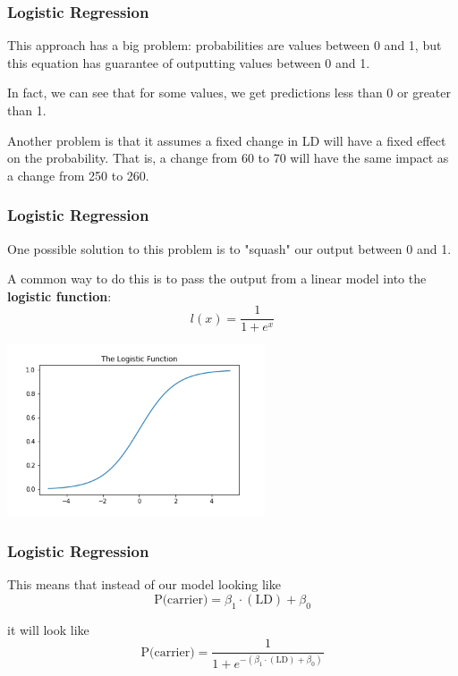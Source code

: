 \documentclass[11pt, table]{beamer}
\begin{document}
\begin{frame}
\frametitle{Logistic Regression}
This approach has a big problem: probabilities are values between 0 and 1, but this equation has guarantee of outputting values between 0 and 1.
\vspace{0.1in}

In fact, we can see that for some values, we get predictions less than 0 or greater than 1.
\vspace{0.1in}

Another problem is that it assumes a fixed change in LD will have a fixed effect on the probability. That is, a change from 60 to 70 will have the same impact as a change from 250 to 260.
\end{frame}

\begin{frame}
\frametitle{Logistic Regression}
One possible solution to this problem is to "squash" our output between 0 and 1.
\vspace{0.1in}

A common way to do this is to pass the output from a linear model into the \textbf{logistic function}:
$$l(x) = \frac{1}{1 + e^{x}}$$

\begin{center}
	\includegraphics[width = 3in]{images/Dystrophy/logistic.png}
\end{center}
\end{frame}

\begin{frame}
\frametitle{Logistic Regression}
This means that instead of our model looking like
$$\text{P(carrier)} = \beta_1\cdot(\text{LD}) + \beta_0$$

it will look like
$$\text{P(carrier)} = \frac{1}{1 + e^{-(\beta_1\cdot(\text{LD}) + \beta_0)}}$$
\end{frame}
\end{document}
